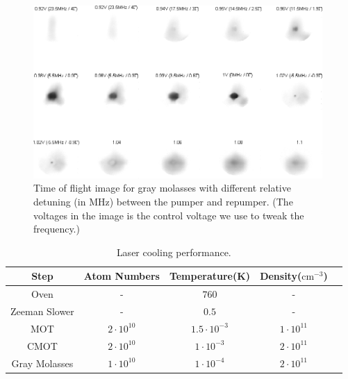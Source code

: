 \begin{figure}
  \begin{center}
    \includegraphics[width=11cm]{gm-ddet.png}
  \end{center}
  \caption{Time of flight image for gray molasses with different relative detuning (in MHz) between the pumper and repumper. (The voltages in the image is the control voltage we use to tweak the frequency.)}
  \label{exp:gm-ddet}
\end{figure}
\begin{table}
  \begin{center}
    \begin{tabular}{|c|c|c|c|c|}\hline
      Step&Atom Numbers&Temperature(K)&Density($\text{cm}^{-3}$)\\\hline
      Oven&-&$760$&-\\\hline
      Zeeman Slower&-&$0.5$&-\\\hline
      MOT&$2\cdot10^{10}$&$1.5\cdot10^{-3}$&$1\cdot10^{11}$\\\hline
      CMOT&$2\cdot10^{10}$&$1\cdot10^{-3}$&$2\cdot10^{11}$\\\hline
      Gray Molasses&$1\cdot10^{10}$&$1\cdot10^{-4}$&$2\cdot10^{11}$\\\hline
    \end{tabular}
  \end{center}
  \caption{Laser cooling performance.}
  \label{exp:laser-cooling}
\end{table}

